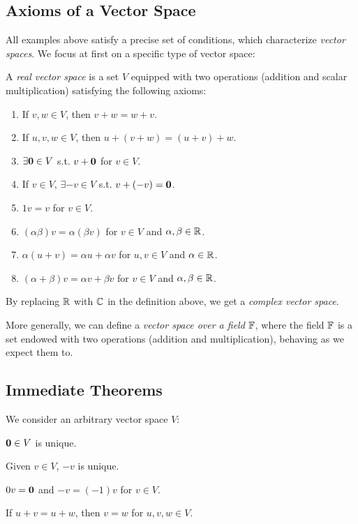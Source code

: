 \subsection{Axioms of a Vector Space}
All examples above satisfy a precise set of conditions, which characterize \emph{vector spaces}. We focus at first on a specific type of vector space:

\begin{definition}
	A \emph{real vector space} is a set $V$ equipped with two operations (addition and scalar multiplication) satisfying the following axioms:
	\begin{enumerate}[{Ax.}1)]
		\item If $v,w\in V$, then $v+w=w+v$.
        \item If $u,v,w\in V$, then $u+(v+w)=(u+v)+w$.
        \item $\exists\mathbf{0}\in V$ s.t. $v+\mathbf{0}$ for $v\in V$. \label{ax:zerovec}
        \item If $v\in V$, $\exists -v\in V$ s.t. $v+(-v)=\mathbf{0}$.
        \item $1v=v$ for $v\in V$.
        \item $(\alpha\beta)v=\alpha(\beta v)$ for $v\in V$ and $\alpha,\beta\in\mathbb{R}$.
        \item $\alpha(u+v)=\alpha u + \alpha v$ for $u,v\in V$ and $\alpha\in\mathbb{R}$.
        \item $(\alpha+\beta)v=\alpha v + \beta v$ for $v\in V$ and $\alpha,\beta\in\mathbb{R}$.
	\end{enumerate}
\end{definition}
\begin{remark*}
	By replacing $\mathbb{R}$ with $\mathbb{C}$ in the definition above, we get a \emph{complex vector space}.

    More generally, we can define a \emph{vector space over a field $\mathbb{F}$}, where the field $\mathbb{F}$ is a set endowed with two operations (addition and multiplication), behaving as we expect them to.
\end{remark*}

\subsection{Immediate Theorems}
We consider an arbitrary vector space $V$:
\begin{theorem}\label{thm:zerounique}
	$\mathbf{0}\in V$ is unique.
\end{theorem}
\begin{theorem}
	Given $v\in V$, $-v$ is unique.
\end{theorem}
\begin{theorem}
	$0v=\mathbf{0}$ and $-v=(-1)v$ for $v\in V$.
\end{theorem}
\begin{theorem}
	If $u+v=u+w$, then $v=w$ for $u,v,w\in V$.
\end{theorem}

